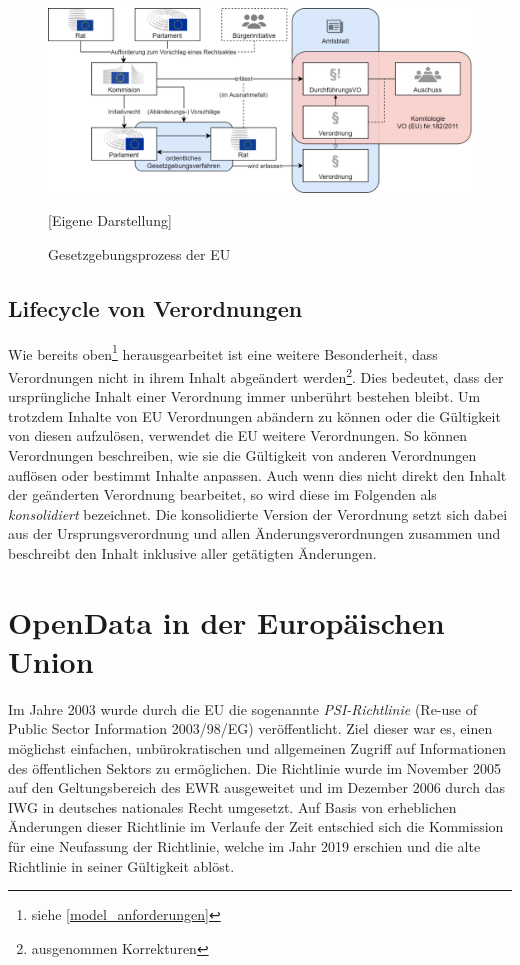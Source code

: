     \begin{figure}[H]
        \centering
        \includegraphics[width=\linewidth]{gfx/Gesegebungsprozess.png}
        \caption{Gesetzgebungsprozess der EU} 
        [Eigene Darstellung]
        \label{fig:europeg}
    \end{figure}
        
\subsection{Lifecycle von Verordnungen}
    
    Wie bereits oben\footnote{siehe \ref{model_anforderungen}} herausgearbeitet ist eine weitere Besonderheit, dass Verordnungen nicht in ihrem Inhalt abgeändert werden\footnote{ausgenommen Korrekturen}.
    Dies bedeutet, dass der ursprüngliche Inhalt einer Verordnung immer unberührt bestehen bleibt.
    Um trotzdem Inhalte von \ac{EU} Verordnungen abändern zu können oder die Gültigkeit von diesen aufzulösen, verwendet die \ac{EU} weitere Verordnungen.
    So können Verordnungen beschreiben, wie sie die Gültigkeit von anderen Verordnungen auflösen oder bestimmt Inhalte anpassen.
    Auch wenn dies nicht direkt den Inhalt der geänderten Verordnung bearbeitet, so wird diese im Folgenden als \textit{konsolidiert} bezeichnet.
    Die konsolidierte Version der Verordnung setzt sich dabei aus der Ursprungsverordnung und allen Änderungsverordnungen zusammen und beschreibt den Inhalt inklusive aller getätigten Änderungen.
    

\section{OpenData in der Europäischen Union}

    Im Jahre 2003 wurde durch die EU die sogenannte \textit{PSI-Richtlinie} (Re-use of Public Sector Information 2003/98/EG) veröffentlicht.
    Ziel dieser war es, einen möglichst einfachen, unbürokratischen und allgemeinen Zugriff auf Informationen des öffentlichen Sektors zu ermöglichen.
    Die Richtlinie wurde im November 2005 auf den Geltungsbereich des EWR ausgeweitet\cite{2005D0105} und im Dezember 2006 durch das \ac{IWG} in deutsches nationales Recht umgesetzt.
    Auf Basis von erheblichen Änderungen dieser Richtlinie im Verlaufe der Zeit entschied sich die Kommission für eine Neufassung der Richtlinie, welche im Jahr 2019 erschien und die alte Richtlinie in seiner Gültigkeit ablöst. \cite[ErwG. 1ff.]{2003L0098}
        
